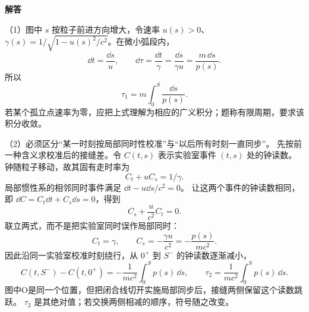 \begin{advsolution}
\begin{center}\begin{minipage}{.96\linewidth}\centering
\raggedright{\bfseries\color{DeepBlue}解答}\par\smallskip\centering

\label{advA6:quality:A6-source-exercises:a1}
\end{minipage}\end{center}

（1）图中 $s$ 按粒子前进方向增大，令速率 $u(s)>0$、
$\gamma(s)=1/\sqrt{1-u(s)^2/c^2}$。在微小弧段内，
\[
 \dd t=\frac{\dd s}{u},\qquad
 \dd\tau=\frac{\dd t}{\gamma}=\frac{\dd s}{\gamma u}
 =\frac{m\,\dd s}{p(s)}.
\]
所以
\[
 \boxed{\tau_1=m\int_0^S\frac{\dd s}{p(s)}}.
\]
若某个孤立点速率为零，应把上式理解为相应的广义积分；题称有限周期，要求该积分收敛。

（2）必须区分“某一时刻按局部同时性校准”与“以后所有时刻一直同步”。
先按前一种含义求校准后的接缝差。令 $C(t,s)$ 表示实验室事件 $(t,s)$ 处的钟读数。
钟随粒子移动，故其固有走时率为
\[
 C_t+u C_s=1/\gamma.
\]
局部惯性系的相邻同时事件满足 $\dd t-u\dd s/c^2=0$。
让这两个事件的钟读数相同，即 $\dd C=C_t\dd t+C_s\dd s=0$，得到
\[
 C_s+\frac u{c^2}C_t=0.
\]
联立两式，而不是把实验室同时误作局部同时：
\[
 C_t=\gamma,\qquad C_s=-\frac{\gamma u}{c^2}=-\frac{p(s)}{mc^2}.
\]
因此沿同一实验室校准时刻绕行，从 $0^+$ 到 $S^-$ 的钟读数逐渐减小，
\[
 C(t,S^-)-C(t,0^+)=-\frac1{mc^2}\int_0^S p(s)\,\dd s,
 \qquad
 \boxed{\tau_2=\frac1{mc^2}\int_0^S p(s)\,\dd s}.
\]
图中O是同一个位置，但把闭合线切开实施局部同步后，接缝两侧保留这个读数跳跃。
$\tau_2$ 是其绝对值；若交换两侧相减的顺序，符号随之改变。


\end{advsolution}
